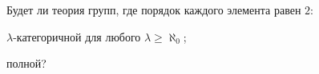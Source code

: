 Будет ли теория групп, где порядок каждого элемента равен $2$:
\begin{enumcyr}
    \item $\lambda$-категоричной для любого $\lambda \ge \aleph_0$;
    \item полной?
\end{enumcyr}
